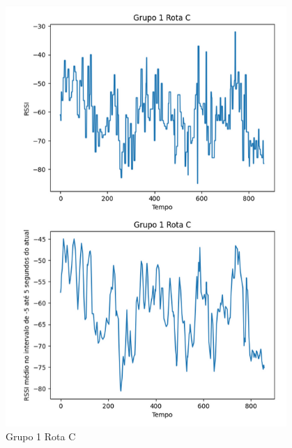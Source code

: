 \documentclass{article}
\begin{document}
\begin{figure}
  \begin{center}
    \includegraphics[width=0.95\textwidth]{figures/grupo_1-rota_c}
  \end{center}
  \caption{Grupo 1 Rota C}\label{fig:grupo_1-rota_c}
\end{figure}
\end{document}
